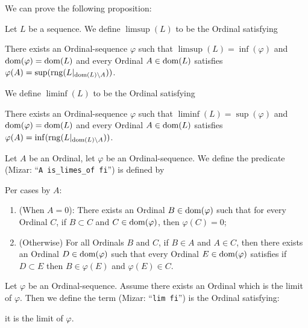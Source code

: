 \documentclass{article}
\begin{document}
We can prove the following proposition:
\begin{thm}
\item\label{ordinal2:26} 
\end{thm}

\begin{definition}
Let $L$ be a sequence. We define $\limsup(L)$ to be the Ordinal
satisfying
\begin{defn}
\item There exists an Ordinal-sequence $\varphi$
  such that $\limsup(L)=\inf(\varphi)$
  and $\operatorname{dom}(\varphi)=\operatorname{dom}(L)$ and
  every Ordinal $A\in\operatorname{dom}(L)$ satisfies
  $\varphi(A)=\sup(\operatorname{rng}(L|_{\operatorname{dom}(L)\setminus A}))$.
\end{defn}
We define $\liminf(L)$ to be the Ordinal satisfying
\begin{defn}
\item There exists an Ordinal-sequence $\varphi$ such that
  $\liminf(L)=\sup(\varphi)$ and $\operatorname{dom}(\varphi)=\operatorname{dom}(L)$ and every
  Ordinal $A\in\operatorname{dom}(L)$ satisfies
  $\varphi(A)=\inf(\operatorname{rng}(L|_{\operatorname{dom}(L)\setminus A}))$.
\end{defn}
\end{definition}

\begin{definition}
Let $A$ be an Ordinal, let $\varphi$ be an Ordinal-sequence.
We define the predicate 
(Mizar: ``\verb#A is_limes_of fi#'')
is defined by
\begin{defn}
\item Per cases by $A$:
  \begin{enumerate}[label=(\roman*)]
  \item (When $A=0$): There exists an Ordinal $B\in\operatorname{dom}(\varphi)$ such that for every
    Ordinal $C$, if $B\subset C$ and $C\in\operatorname{dom}(\varphi)$, then $\varphi(C)=0$;
  \item (Otherwise) For all Ordinals $B$ and $C$, if $B\in A$ and $A\in C$, 
    then there exists an Ordinal $D\in\operatorname{dom}(\varphi)$ such that every
    Ordinal $E\in\operatorname{dom}(\varphi)$ satisfies if $D\subset E$ then
    $B\in\varphi(E)$ and $\varphi(E)\in C$.
  \end{enumerate}
\end{defn}
\end{definition}

\begin{definition}
Let $\varphi$ be an Ordinal-sequence. Assume there exists an Ordinal
which is the limit of $\varphi$.
Then we define the term  (Mizar:
``\verb#lim fi#'') is the Ordinal satisfying:
\begin{defn}
\item it is the limit of $\varphi$.
\end{defn}
\end{definition}
\end{document}
